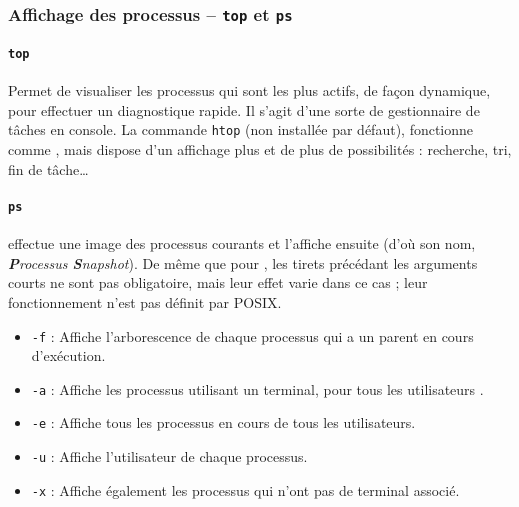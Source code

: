 \subsubsection{Affichage des processus -- \texttt{top} et \texttt{ps}}

\paragraph{\texttt{top}} 
Permet de visualiser les processus qui sont les plus actifs, de façon dynamique, pour effectuer un diagnostique rapide. Il s'agit d'une sorte de gestionnaire de tâches en console.\newline
{} La commande \texttt{htop} (non installée par défaut), fonctionne comme , mais dispose d'un affichage plus et de plus de possibilités : recherche, tri, fin de tâche\dots

\paragraph{\texttt{ps}} 
 effectue une image des processus courants et l'affiche ensuite (d'où son nom, \textit{\textbf{P}rocessus \textbf{S}napshot}). De même que pour , les tirets précédant les arguments courts ne sont pas obligatoire, mais leur effet varie dans ce cas ; leur fonctionnement n'est pas définit par POSIX.
\begin{itemize}
    \item \texttt{-f} : Affiche l'arborescence de chaque processus qui a un parent en cours d'exécution.
    \item \texttt{-a} : Affiche les processus utilisant un terminal, pour tous les utilisateurs .
    \item \texttt{-e} : Affiche tous les processus en cours de tous les utilisateurs.
    \item \texttt{-u} : Affiche l'utilisateur de chaque processus.
    \item \texttt{-x} : Affiche également les processus qui n'ont pas de terminal associé.
\end{itemize}

